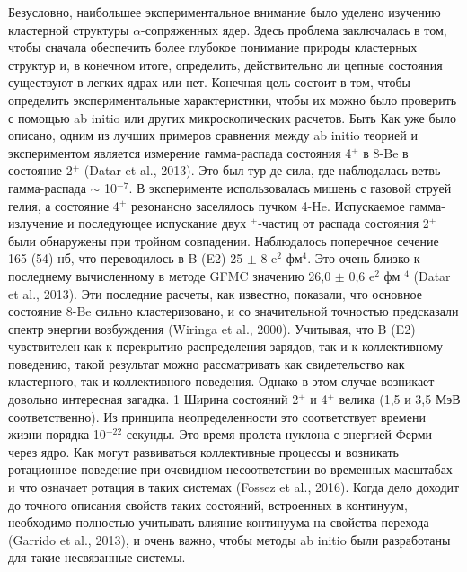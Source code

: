 \documentclass[fontsize=14pt]{scrarticle}
\begin{document}
Безусловно, наибольшее экспериментальное внимание было уделено изучению кластерной структуры $\alpha$-сопряженных ядер. Здесь проблема заключалась в том, чтобы сначала обеспечить более глубокое понимание природы кластерных структур и, в конечном итоге, определить, действительно ли цепные состояния существуют в легких ядрах или нет. Конечная цель состоит в том, чтобы определить экспериментальные характеристики, чтобы их можно было проверить с помощью ab initio или других микроскопических расчетов.
Быть
Как уже было описано, одним из лучших примеров сравнения между ab initio теорией и экспериментом является измерение гамма-распада состояния 4$^{+}$ в 8-Be в состояние 2$^{+}$ (Datar et al., 2013). Это был тур-де-сила, где наблюдалась ветвь гамма-распада $\sim$ 10$^{-7}$. В эксперименте использовалась мишень с газовой струей гелия, а состояние 4$^{+}$ резонансно заселялось пучком 4-He. Испускаемое гамма-излучение и последующее испускание двух $^{+}$-частиц от распада состояния 2$^{+}$ были обнаружены при тройном совпадении. Наблюдалось поперечное сечение 165 (54) нб, что переводилось в B (E2) 25 $\pm$ 8 e$^{2}$ фм$^{4}$. Это очень близко к последнему вычисленному в методе GFMC значению 26,0 $\pm$ 0,6 e$^{2}$ фм $^{4}$ (Datar et al., 2013). Эти последние расчеты, как известно, показали, что основное состояние 8-Be сильно кластеризовано, и со значительной точностью предсказали спектр энергии возбуждения (Wiringa et al., 2000). Учитывая, что B (E2) чувствителен как к перекрытию распределения зарядов, так и к коллективному поведению, такой результат можно рассматривать как свидетельство как кластерного, так и коллективного поведения. Однако в этом случае возникает довольно интересная загадка. 1 Ширина состояний 2$^{+}$ и 4$^{+}$ велика (1,5 и 3,5 МэВ соответственно). Из принципа неопределенности это соответствует времени жизни порядка 10$^{-22}$ секунды. Это время пролета нуклона с энергией Ферми через ядро. Как могут развиваться коллективные процессы и возникать ротационное поведение при очевидном несоответствии во временных масштабах и что означает ротация в таких системах (Fossez et al., 2016). Когда дело доходит до точного описания свойств таких состояний, встроенных в континуум, необходимо полностью учитывать влияние континуума на свойства перехода (Garrido et al., 2013), и очень важно, чтобы методы ab initio были разработаны для такие несвязанные системы.
\end{document}
